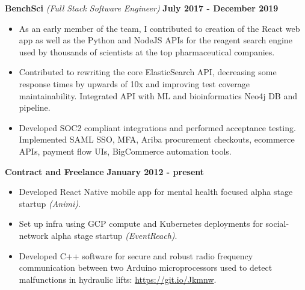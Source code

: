\documentclass{article}
\begin{document}
{\bf  BenchSci } \textit{(Full Stack Software Engineer)} \hfill {\bf July 2017 - December 2019 \/}
\begin{itemize}[leftmargin=*]
    \itemsep0em
    \renewcommand\labelitemi{\tiny$\bullet$}
    \item As an early member of the team, I contributed to creation of the React web app as well as the Python and NodeJS APIs for the reagent search engine used by thousands of scientists at the top pharmaceutical companies.
    \item Contributed to rewriting the core ElasticSearch API, decreasing some response times by upwards of 10x and improving test coverage maintainability. Integrated API with ML and bioinformatics Neo4j DB and pipeline.
    \item Developed SOC2 compliant integrations and performed acceptance testing. Implemented SAML SSO, MFA, Ariba procurement checkouts, ecommerce APIs, payment flow UIs, BigCommerce automation tools.

\end{itemize}


{\bf Contract and Freelance} \hfill {\bf January 2012 - present\/} 
\begin{itemize}[leftmargin=*]
    \itemsep0em
    \renewcommand\labelitemi{\tiny$\bullet$}
    \item Developed React Native mobile app for mental health focused alpha stage startup \textit{(Animi)}.
    \item Set up infra using GCP compute and Kubernetes deployments for social-network alpha stage startup \textit{(EventReach)}. 
    \item Developed C++ software for secure and robust radio frequency communication between two Arduino microprocessors used to detect malfunctions in hydraulic lifts: \url{https://git.io/Jkmnw}.
\end{itemize}
\end{document}
